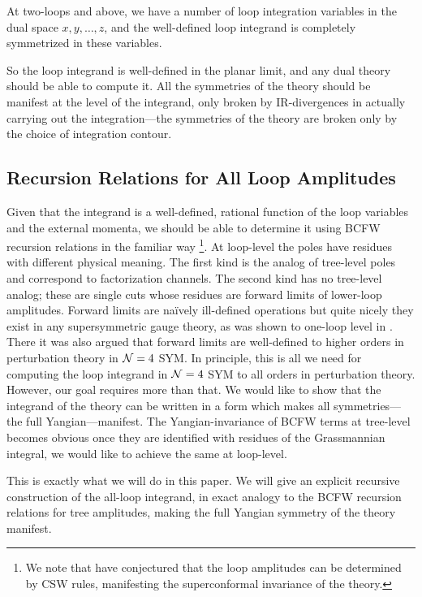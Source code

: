\documentclass[11pt, reqno]{article}
\begin{document}
At two-loops and above, we have a number of loop
integration variables in the dual space $x,y,\ldots,z$, and the well-defined loop integrand
is completely symmetrized in these variables.

So the loop integrand is well-defined in the planar limit, and any dual theory should be
able to compute it. All the symmetries of the theory should be
manifest at the level of the integrand, only broken by IR-divergences in actually carrying out the integration---the symmetries of the theory are broken only by the choice of integration contour.

\subsection{Recursion Relations for All Loop Amplitudes}

Given that the integrand is a well-defined, rational function of the loop variables and the external momenta, we should be able to determine it using BCFW recursion relations in the familiar way \footnote{We note that \cite{Sever:2009aa} have conjectured that the loop amplitudes can be determined by CSW rules, manifesting the superconformal invariance of the theory.}. At loop-level the poles have residues with different physical meaning. The first kind is the analog of tree-level poles and correspond to factorization channels. The second kind has no tree-level analog; these are single cuts whose residues are forward limits of lower-loop amplitudes. Forward limits are na\"{i}vely ill-defined operations but quite nicely they exist in any supersymmetric gauge theory, as was shown to one-loop level in \cite{CaronHuot:2010zt}.  There it was also argued that forward limits are well-defined to higher orders
in perturbation theory in ${\cal N}=4$ SYM. In principle, this is all we need for computing the loop integrand in ${\cal N}=4$ SYM to all orders in perturbation theory. However, our goal requires more than that. We would like to show that the integrand of the theory can be written in a form which makes all symmetries---the full Yangian---manifest. The Yangian-invariance of BCFW terms at tree-level becomes obvious once they are identified with residues of the Grassmannian integral, we would like to achieve the same at loop-level.

This is exactly what we will do in this paper. We will give an explicit recursive
construction of the all-loop integrand, in exact analogy to the BCFW
recursion relations for tree amplitudes, making the full
Yangian symmetry of the theory manifest.
\end{document}

